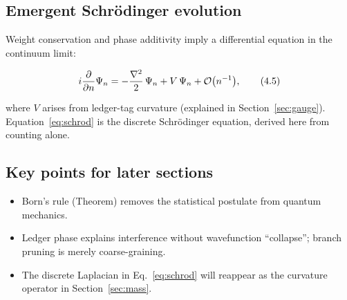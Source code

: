 \subsection{Emergent Schrödinger evolution}

Weight conservation and phase additivity imply a differential equation
in the continuum limit:

\[
  i\frac{\partial}{\partial n}\Psi_n
  =-\frac{\nabla^2}{2}\,\Psi_n + V\,\Psi_n + \order{n^{-1}},
\tag{4.5}\label{eq:schrod}
\]

where $V$ arises from ledger-tag curvature (explained in
Section~\ref{sec:gauge}).  Equation~\eqref{eq:schrod} is the discrete
Schrödinger equation, derived here from counting alone.

\subsection{Key points for later sections}

\begin{itemize}
  \item Born’s rule (Theorem) removes the statistical postulate from
        quantum mechanics.
  \item Ledger phase explains interference without wavefunction
        “collapse”; branch pruning is merely coarse-graining.
  \item The discrete Laplacian in Eq.~\eqref{eq:schrod} will reappear
        as the curvature operator in Section~\ref{sec:mass}.
\end{itemize}

\clearpage
